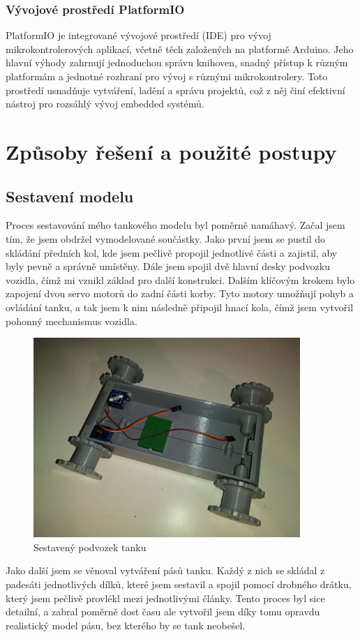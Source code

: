 \documentclass[12pt, a4paper,
oneside
openany
]{report}
\begin{document}
\subsection{Vývojové prostředí PlatformIO}
\noindent PlatformIO je integrované vývojové prostředí (IDE) pro vývoj mikrokontrolerových aplikací, včetně těch založených na platformě Arduino. Jeho hlavní výhody zahrnují jednoduchou správu knihoven, snadný přístup k různým platformám a jednotné rozhraní pro vývoj s různými mikrokontrolery. Toto prostředí usnadňuje vytváření, ladění a správu projektů, což z něj činí efektivní nástroj pro rozsáhlý vývoj embedded systémů.




\chapter{Způsoby řešení a použité postupy}
	
\section{Sestavení modelu} 
\noindent Proces sestavování mého tankového modelu byl poměrně namáhavý. Začal jsem tím, že jsem obdržel vymodelované součástky. Jako první jsem se pustil do skládání předních kol, kde jsem pečlivě propojil jednotlivé části a zajistil, aby byly pevně a správně umístěny. Dále jsem spojil dvě hlavní desky podvozku vozidla, čímž mi vznikl základ pro další konstrukci.
Dalším klíčovým krokem bylo zapojení dvou servo motorů do zadní části korby. Tyto motory umožňují  pohyb a ovládání tanku, a tak jsem k nim následně připojil hnací kola, čímž jsem vytvořil pohonný mechanismus vozidla.

	\begin{figure}[h]
		\centering 
		\includegraphics[width=0.9\textwidth]{image/sestavaa.jpg} %
		\caption{Sestavený podvozek tanku} 
	\end{figure}
\newpage
\noindent Jako další jsem se věnoval vytváření pásů tanku. Každý z nich se skládal z padesáti jednotlivých dílků, které jsem sestavil a spojil pomocí drobného drátku, který jsem pečlivě provlékl mezi jednotlivými články. Tento proces byl sice detailní, a zabral poměrně dost času ale vytvořil jsem díky tomu opravdu realistický model pásu, bez kterého by se tank neobešel.
\end{document}
